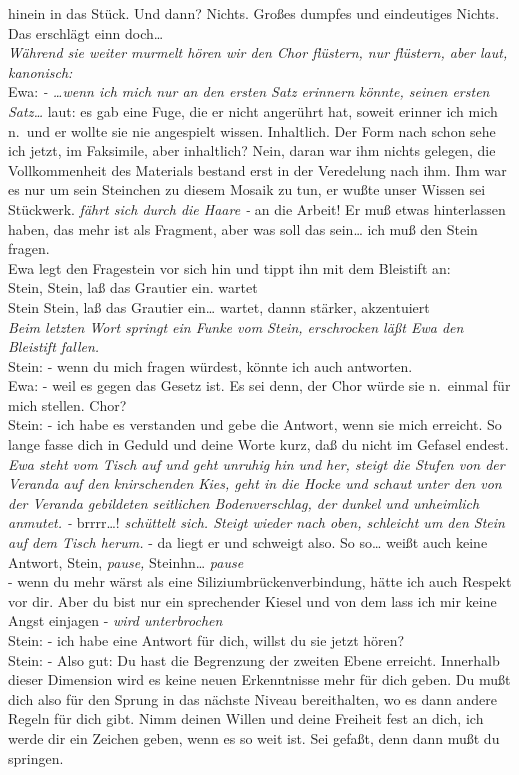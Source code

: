 \documentclass[
]{article}
\begin{document}
hinein in das Stück. Und dann? Nichts. Großes dumpfes und eindeutiges
Nichts. Das erschlägt einn doch\ldots{}\\
\emph{Während sie weiter murmelt hören wir den Chor flüstern, nur
flüstern, aber laut, kanonisch:}\\
Ewa: \emph{- \ldots wenn ich mich nur an den ersten Satz erinnern
könnte, seinen ersten Satz\ldots{} }laut: es gab eine Fuge, die er nicht
angerührt hat, soweit erinner ich mich n.~und er wollte sie nie
angespielt wissen. Inhaltlich. Der Form nach schon sehe ich jetzt, im
Faksimile, aber inhaltlich? Nein, daran war ihm nichts gelegen, die
Vollkommenheit des Materials bestand erst in der Veredelung nach ihm.
Ihm war es nur um sein Steinchen zu diesem Mosaik zu tun, er wußte unser
Wissen sei Stückwerk. \emph{fährt sich durch die Haare - }an die Arbeit!
Er muß etwas hinterlassen haben, das mehr ist als Fragment, aber was
soll das sein\ldots{} ich muß den Stein fragen.\\
Ewa legt den Fragestein vor sich hin und tippt ihn mit dem Bleistift
an:\\
Stein, Stein, laß das Grautier ein. wartet\\
Stein Stein, laß das Grautier ein\ldots{} wartet, dannn stärker,
akzentuiert\\
\emph{Beim letzten Wort springt ein Funke vom Stein, erschrocken läßt
Ewa den Bleistift fallen. }\\
Stein: - wenn du mich fragen würdest, könnte ich auch antworten.\\
Ewa: - weil es gegen das Gesetz ist. Es sei denn, der Chor würde sie
n.~einmal für mich stellen. Chor?\\
Stein: - ich habe es verstanden und gebe die Antwort, wenn sie mich
erreicht. So lange fasse dich in Geduld und deine Worte kurz, daß du
nicht im Gefasel endest.\\
\emph{Ewa steht vom Tisch auf und geht unruhig hin und her, steigt die
Stufen von der Veranda auf den knirschenden Kies, geht in die Hocke und
schaut unter den von der Veranda gebildeten seitlichen Bodenverschlag,
der dunkel und unheimlich anmutet. - }brrrr\ldots! \emph{schüttelt sich.
Steigt wieder nach oben, schleicht um den Stein auf dem Tisch herum. }-
da liegt er und schweigt also. So so\ldots{} weißt auch keine Antwort,
Stein, \emph{pause,} Steinhn\ldots{} \emph{pause}\\
- wenn du mehr wärst als eine Siliziumbrückenverbindung, hätte ich auch
Respekt vor dir. Aber du bist nur ein sprechender Kiesel und von dem
lass ich mir keine Angst einjagen - \emph{wird unterbrochen}\\
Stein: - ich habe eine Antwort für dich, willst du sie jetzt hören?\\
Stein: - Also gut: Du hast die Begrenzung der zweiten Ebene erreicht.
Innerhalb dieser Dimension wird es keine neuen Erkenntnisse mehr für
dich geben. Du mußt dich also für den Sprung in das nächste Niveau
bereithalten, wo es dann andere Regeln für dich gibt. Nimm deinen Willen
und deine Freiheit fest an dich, ich werde dir ein Zeichen geben, wenn
es so weit ist. Sei gefaßt, denn dann mußt du springen.
\end{document}
